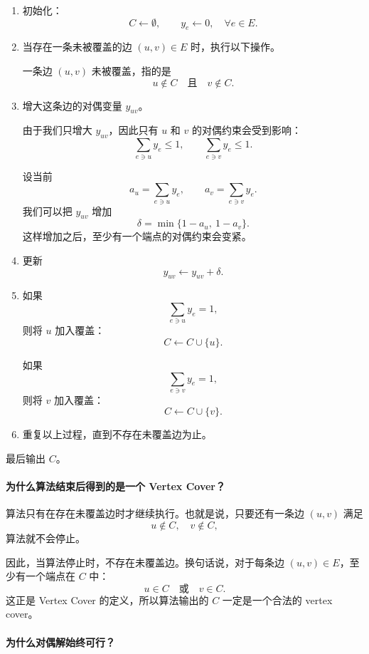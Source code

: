 \documentclass[UTF8,openany,12pt]{ctexbook}
\theoremstyle{remark}
\begin{document}
\begin{enumerate}
  \item 初始化：
  \[
    C\leftarrow \emptyset,\qquad y_e\leftarrow 0,\quad \forall e\in E.
  \]

  \item 当存在一条未被覆盖的边 \((u,v)\in E\) 时，执行以下操作。

  一条边 \((u,v)\) 未被覆盖，指的是
  \[
    u\notin C \quad\text{且}\quad v\notin C.
  \]

  \item 增大这条边的对偶变量 \(y_{uv}\)。

  由于我们只增大 \(y_{uv}\)，因此只有 \(u\) 和 \(v\) 的对偶约束会受到影响：
  \[
    \sum_{e\ni u}y_e \le 1,
    \qquad
    \sum_{e\ni v}y_e \le 1.
  \]

  设当前
  \[
    a_u=\sum_{e\ni u}y_e,\qquad a_v=\sum_{e\ni v}y_e.
  \]
  我们可以把 \(y_{uv}\) 增加
  \[
    \delta=\min\{1-a_u,\ 1-a_v\}.
  \]
  这样增加之后，至少有一个端点的对偶约束会变紧。

  \item 更新
  \[
    y_{uv}\leftarrow y_{uv}+\delta.
  \]

  \item 如果
  \[
    \sum_{e\ni u}y_e=1,
  \]
  则将 \(u\) 加入覆盖：
  \[
    C\leftarrow C\cup\{u\}.
  \]

  如果
  \[
    \sum_{e\ni v}y_e=1,
  \]
  则将 \(v\) 加入覆盖：
  \[
    C\leftarrow C\cup\{v\}.
  \]

  \item 重复以上过程，直到不存在未覆盖边为止。
\end{enumerate}

最后输出 \(C\)。

\paragraph{为什么算法结束后得到的是一个 Vertex Cover？}

算法只有在存在未覆盖边时才继续执行。也就是说，只要还有一条边
\((u,v)\) 满足
\[
  u\notin C,\quad v\notin C,
\]
算法就不会停止。

因此，当算法停止时，不存在未覆盖边。换句话说，对于每条边
\((u,v)\in E\)，至少有一个端点在 \(C\) 中：
\[
  u\in C \quad\text{或}\quad v\in C.
\]
这正是 Vertex Cover 的定义，所以算法输出的 \(C\) 一定是一个合法的
vertex cover。

\paragraph{为什么对偶解始终可行？}
\end{document}
